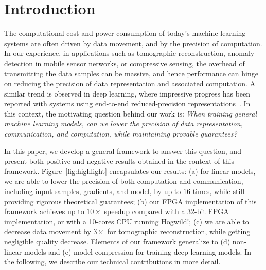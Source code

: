 \documentclass{article}
\begin{document}
\section{Introduction}

\vspace{-1em}
The computational cost and power consumption of today's machine learning systems are often driven by data movement, and by the precision of computation. 
In our experience, in applications such as tomographic reconstruction, anomaly detection in mobile sensor networks, or compressive sensing, the overhead of transmitting the data samples can be massive, 
and hence performance can hinge on reducing the precision of data representation and 
associated computation. 
A similar trend is observed in deep learning, where impressive progress has been reported with systems 
using end-to-end reduced-precision representations~\cite{hubara2016quantized,
rastegari2016xnor,zhou2016dorefa,miyashita2016convolutional}. 
In this context, the motivating question behind our work is:  {\em When training general machine learning models,
can we lower the precision of data representation,
communication, and computation, while maintaining provable guarantees?}
 
% 
%

In this paper, we develop a general 
framework to answer this question, and
present both  positive and negative results
 obtained in the context of this framework. 
 Figure~\ref{fig:highlight} encapsulates our results: 
(a) for linear models, we are able to lower the precision of both computation and communication, including input samples, gradients, and model, by up to $16$ times, while still providing rigorous theoretical guarantees; 
(b) our FPGA implementation of this framework achieves up to $10\times$ speedup compared with
a 32-bit FPGA implementation, or with a 10-cores CPU running Hogwild!;  
(c) we are able to decrease data movement by $3\times$ for
tomographic reconstruction, while getting negligible quality decrease. 
Elements of our framework generalize to (d) non-linear models and  (e) model compression for training deep learning models. 
In the following, we describe our technical contributions in more detail. 
\end{document}
